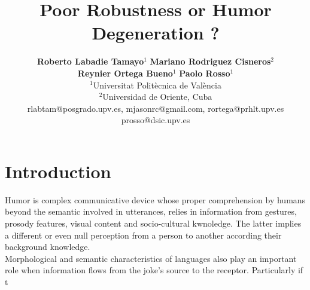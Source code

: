 \documentclass[a4paper,11pt,twocolumn,twoside]{article}
\title{Poor Robustness or Humor Degeneration ?}
\author {\textbf{Roberto Labadie Tamayo$^1$} \textbf{Mariano Rodriguez Cisneros$^2$} \\
 \textbf{Reynier Ortega  Bueno$^1$}  \textbf{Paolo Rosso$^1$}\\
$^1$Universitat Politècnica de València\\
$^2$Universidad de Oriente, Cuba\\
rlabtam@posgrado.upv.es, mjasonrc@gmail.com, rortega@prhlt.upv.es\\
prosso@dsic.upv.es\\
}
\begin{document}



\label{firstpage} \maketitle

\vspace{20mm}

\section{Introduction}

Humor is complex communicative device whose proper comprehension by humans  beyond the semantic involved in utterances, relies in information from gestures, prosody features, visual content and socio-cultural kwnoledge. The latter implies a different or even null perception from a person to another according their background knowledge.
\\
Morphological and semantic characteristics of languages also play an important role when information flows from the joke's source to the receptor. Particularly if t



\end{document}
